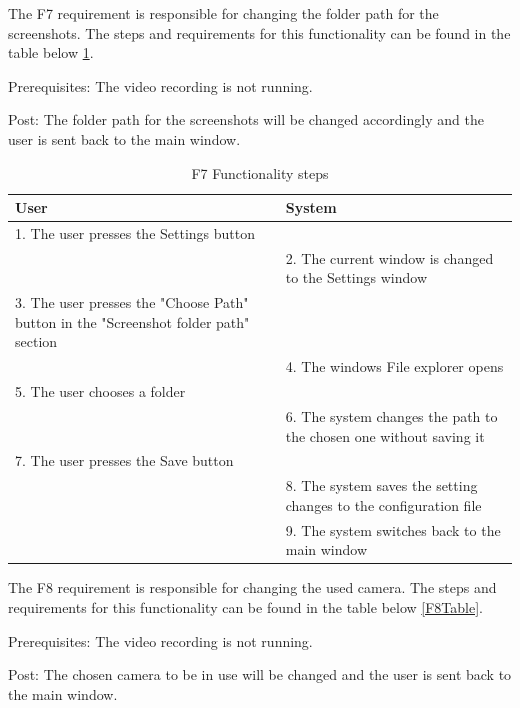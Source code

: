 \par The F7 requirement is responsible for changing the folder path for the screenshots. The steps and requirements for this functionality can be found in the table below \ref{F7Table}.
\par Prerequisites: The video recording is not running.
\par Post: The folder path for the screenshots will be changed accordingly and the user is sent back to the main window.

\begin{table}[htbp]
\begin{center}
\begin{tabular}
{|p{180pt}|p{180pt}|}
\hline
 User & System\\
\hline 
\hline 1. The user presses the Settings button &  \\
\hline  & 2. The current window is changed to the Settings window \\
\hline 3. The user presses the "Choose Path" button in the "Screenshot folder path" section&  \\
\hline  & 4. The windows File explorer opens \\
\hline 5. The user chooses a folder &  \\
\hline  & 6. The system changes the path to the chosen one without saving it \\
\hline 7. The user presses the Save button &  \\
\hline  & 8. The system saves the setting changes to the configuration file \\
\hline  & 9. The system switches back to the main window \\
\hline
\end{tabular}
\end{center}
\caption{F7 Functionality steps}
\label{F7Table}
\end{table}

\par The F8 requirement is responsible for changing the used camera. The steps and requirements for this functionality can be found in the table below \ref{F8Table}.
\par Prerequisites: The video recording is not running.
\par Post: The chosen camera to be in use will be changed and the user is sent back to the main window.

